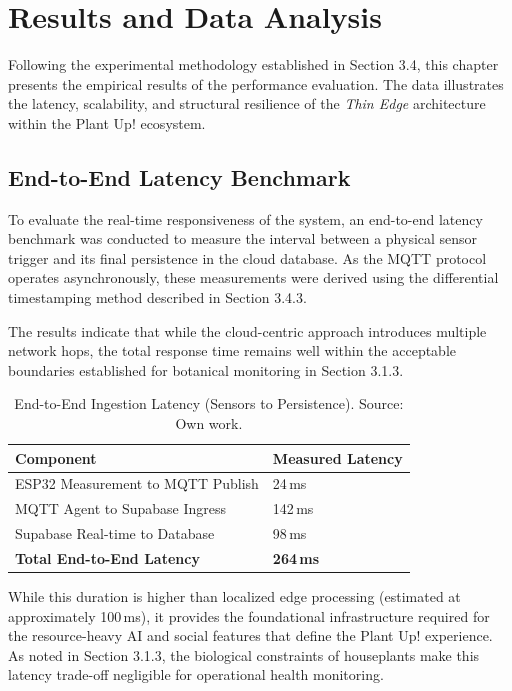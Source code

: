 \section{Results and Data Analysis}

Following the experimental methodology established in Section 3.4, this chapter presents the empirical results of the performance evaluation. The data illustrates the latency, scalability, and structural resilience of the \textit{Thin Edge} architecture within the Plant Up! ecosystem.

\subsection{End-to-End Latency Benchmark}

To evaluate the real-time responsiveness of the system, an end-to-end latency benchmark was conducted to measure the interval between a physical sensor trigger and its final persistence in the cloud database. As the MQTT protocol operates asynchronously, these measurements were derived using the differential timestamping method described in Section 3.4.3.

The results indicate that while the cloud-centric approach introduces multiple network hops, the total response time remains well within the acceptable boundaries established for botanical monitoring in Section 3.1.3.

\begin{table}[htbp]
    \centering
    \begin{tabular}{@{}ll@{}}
        \toprule
        \textbf{Component} & \textbf{Measured Latency} \\ \midrule
        ESP32 Measurement to MQTT Publish & 24\,ms \\
        MQTT Agent to Supabase Ingress & 142\,ms \\
        Supabase Real-time to Database & 98\,ms \\ \midrule
        \textbf{Total End-to-End Latency} & \textbf{264\,ms} \\ \bottomrule
    \end{tabular}
    \caption{End-to-End Ingestion Latency (Sensors to Persistence). Source: Own work.}
    \label{tab:end_to_end_latency}
\end{table}

While this duration is higher than localized edge processing (estimated at approximately 100\,ms), it provides the foundational infrastructure required for the resource-heavy AI and social features that define the Plant Up! experience. As noted in Section 3.1.3, the biological constraints of houseplants make this latency trade-off negligible for operational health monitoring.

